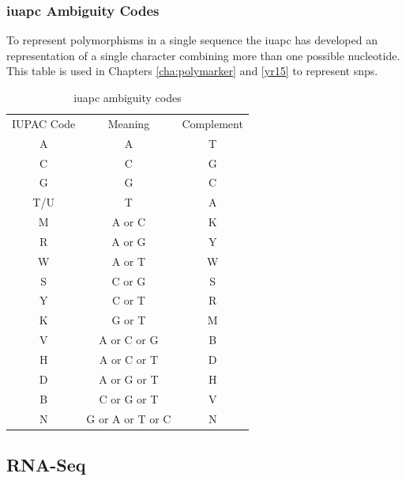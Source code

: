 \pagebreak
\subsubsection{\gls{iuapc} Ambiguity Codes}
\label{lit:ambiguity}
To represent polymorphisms in a single sequence the \gls{iuapc} has developed an representation of a single character combining more than one possible nucleotide. 
This table is used in Chapters \ref{cha:polymarker} and \ref{yr15} to represent \glspl{snp}.

\begin{table}[h!]
\caption{\gls{iuapc} ambiguity codes}
\centering
\begin{tabular}{ccc}
\toprule
IUPAC Code & Meaning & Complement \\
A & A & T \\
C & C & G \\
G & G & C \\
T/U & T & A \\
M & A or C & K \\
R & A or G & Y \\
W & A or T & W \\
S & C or G & S \\
Y & C or T & R \\
K & G or T & M \\
V & A or C or G & B \\
H & A or C or T & D \\
D & A or G or T & H \\
B & C or G or T & V \\
N & G or A or T or C & N \\
\bottomrule
\end{tabular}
\end{table}

\subsection{RNA-Seq}
\label{lit:RNASeq:bioinf}

